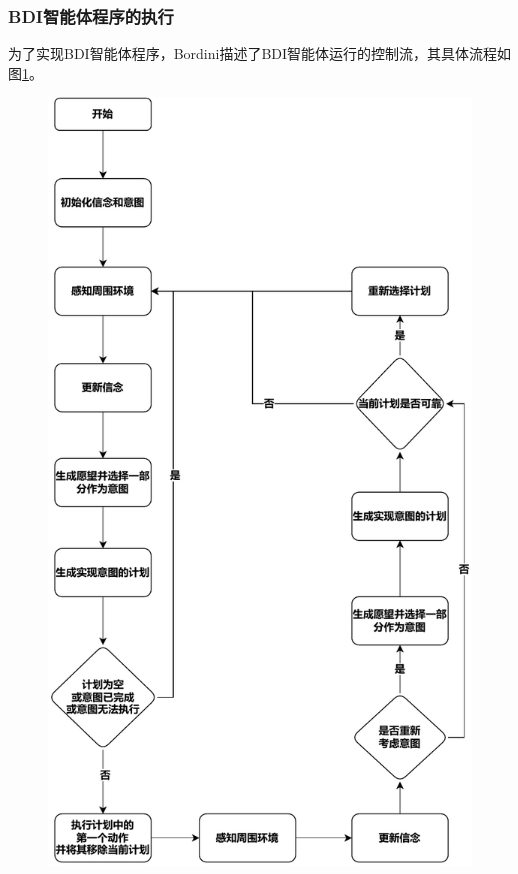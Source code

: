 \subsubsection{BDI智能体程序的执行}
为了实现BDI智能体程序，Bordini\cite{bordini2007programming}描述了BDI智能体运行的控制流，其具体流程如图\ref{fig:deliberation}。
\begin{figure}[htb]
\centering
\includegraphics[scale=0.6]{./figs/deliberation_cycle}
\label{fig:deliberation}
\end{figure}

